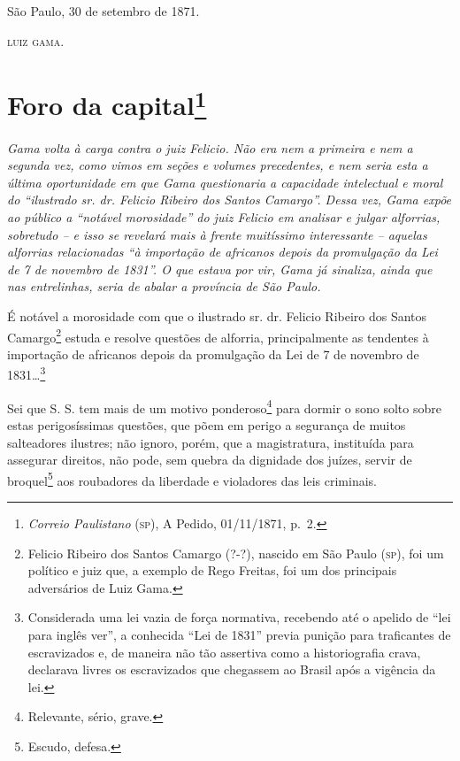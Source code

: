 {São Paulo, 30 de setembro de 1871.

\textsc{luiz gama}.

\chapter{Foro da capital\footnote{\emph{Correio Paulistano} (\textsc{sp}), A Pedido, 01/11/1871,
  p.~2.}} %

\begin{didascalia}
\emph{Gama volta à carga contra o juiz Felicio. Não era nem a primeira e
nem a segunda vez, como vimos em seções e volumes precedentes, e nem
seria esta a última oportunidade em que Gama questionaria a capacidade
intelectual e moral do ``ilustrado sr. dr. Felicio Ribeiro dos Santos
Camargo''. Dessa vez, Gama expõe ao público a ``notável morosidade'' do
juiz Felicio em analisar e julgar alforrias, sobretudo -- e isso se
revelará mais à frente muitíssimo interessante -- aquelas alforrias
relacionadas ``à importação de africanos depois da promulgação da Lei de
7 de novembro de 1831''. O que estava por vir, Gama já sinaliza, ainda
que nas entrelinhas, seria de abalar a província de São Paulo.}
\end{didascalia}

É notável a morosidade com que o ilustrado sr. dr. Felicio Ribeiro dos
Santos Camargo\footnote{ Felicio Ribeiro dos Santos Camargo (?-?),
  nascido em São Paulo (\textsc{sp}), foi um político e juiz que, a exemplo de
  Rego Freitas, foi um dos principais adversários de Luiz Gama.} estuda
e resolve questões de alforria, principalmente as tendentes à importação
de africanos depois da promulgação da Lei de 7 de novembro de
1831\ldots{}\footnote{ Considerada uma lei vazia de força normativa,
  recebendo até o apelido de ``lei para inglês ver'', a conhecida ``Lei de
  1831'' previa punição para traficantes de escravizados e, de maneira
  não tão assertiva como a historiografia crava, declarava livres os
  escravizados que chegassem ao Brasil após a vigência da lei.}

Sei que S. S. tem mais de um motivo ponderoso\footnote{ Relevante,
  sério, grave.} para dormir o sono solto sobre estas perigosíssimas
questões, que põem em perigo a segurança de muitos salteadores ilustres;
não ignoro, porém, que a magistratura, instituída para assegurar
direitos, não pode, sem quebra da dignidade dos juízes, servir de
broquel\footnote{ Escudo, defesa.} aos roubadores da liberdade e
violadores das leis criminais.

}
